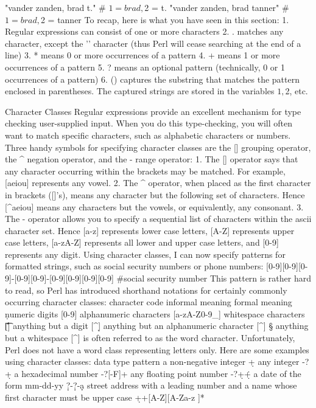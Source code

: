 "vander zanden,   brad   t."    # $1 = brad, $2 = t.
"vander zanden, brad tanner"    # $1 = brad, $2 = tanner
To recap, here is what you have seen in this section: 
1. Regular expressions can consist of one or more characters 
2. . matches any character, except the '\n' character (thus Perl will cease searching at the end of a line) 
3. * means 0 or more occurrences of a pattern 
4. + means 1 or more occurrences of a pattern 
5. ? means an optional pattern (technically, 0 or 1 occurrences of a pattern) 
6. () captures the substring that matches the pattern enclosed in parentheses. The captured strings are stored in the variables $1, $2, etc. 

Character Classes 
Regular expressions provide an excellent mechanism for type checking user-supplied input. When you do this type-checking, you will often want to match specific characters, such as alphabetic characters or numbers. Three handy symbols for specifying character classes are the [] grouping operator, the ^ negation operator, and the - range operator: 
1. The [] operator says that any character occurring within the brackets may be matched. For example, [aeiou] represents any vowel. 
2. The ^ operator, when placed as the first character in brackets ([]'s), means any character but the following set of characters. Hence [^aeiou] means any characters but the vowels, or equivalently, any consonant. 
3. The - operator allows you to specify a sequential list of characters within the ascii character set. Hence [a-z] represents lower case letters, [A-Z] represents upper case letters, [a-zA-Z] represents all lower and upper case letters, and [0-9] represents any digit. 
Using character classes, I can now specify patterns for formatted strings, such as social security numbers or phone numbers: 
[0-9][0-9][0-9]-[0-9][0-9]-[0-9][0-9][0-9][0-9]  #social security number
This pattern is rather hard to read, so Perl has introduced shorthand notations for certainly commonly occurring character classes: 
character code
informal meaning
formal meaning
\d
numeric digits
[0-9]
\w
alphanumeric characters
[a-zA-Z0-9_]
\s
whitespace characters
[\f\t\n\r ]
\D
anything but a digit
[^\d]
\W
anything but an alphanumeric character
[^\w]
\S
anything but a whitespace
[^\s]
\w is often referred to as the word character. Unfortunately, Perl does not have a word class representing letters only. 
Here are some examples using character classes: 
data type
pattern
a non-negative integer
\d+
any integer
-?\d+
a hexadecimal number
-?[\dA-F]+
any floating point number
-?\d+\.\d+
a date of the form mm-dd-yy
\d\d?-\d\d?-\d\d
a street address with a leading number and a name whose first character must be upper case
\d+\s+[A-Z][A-Za-z ]*

